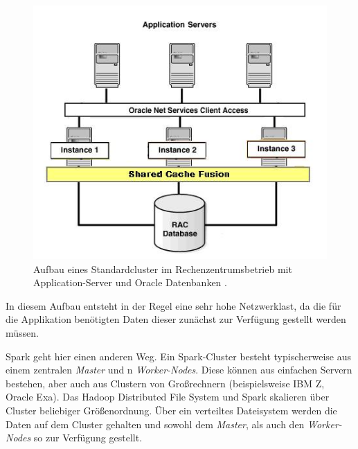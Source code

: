 \begin{figure}[htb!]
\centering
\includegraphics[width=1.0\textwidth]{bilder/oracle_cluster.jpg}
\caption{Aufbau eines Standardcluster im Rechenzentrumsbetrieb mit Application-Server und Oracle Datenbanken \protect{}. }
\label{fig:sparkclustermastermitworker}
\end{figure} 

In diesem Aufbau entsteht in der Regel eine sehr hohe Netzwerklast, da die für die Applikation benötigten Daten dieser zunächst zur Verfügung gestellt werden müssen. 

Spark geht hier einen anderen Weg. Ein Spark-Cluster besteht typischerweise aus einem zentralen \textit{Master} und n \textit{Worker-Nodes}. Diese können aus einfachen Servern bestehen, aber auch aus Clustern von Großrechnern (beispielsweise IBM Z, Oracle Exa). Das Hadoop Distributed File System und Spark skalieren über Cluster beliebiger Größenordnung. Über ein verteiltes Dateisystem werden die Daten auf dem Cluster gehalten und sowohl dem \textit{Master}, als auch den \textit{Worker-Nodes} so zur Verfügung gestellt. 


